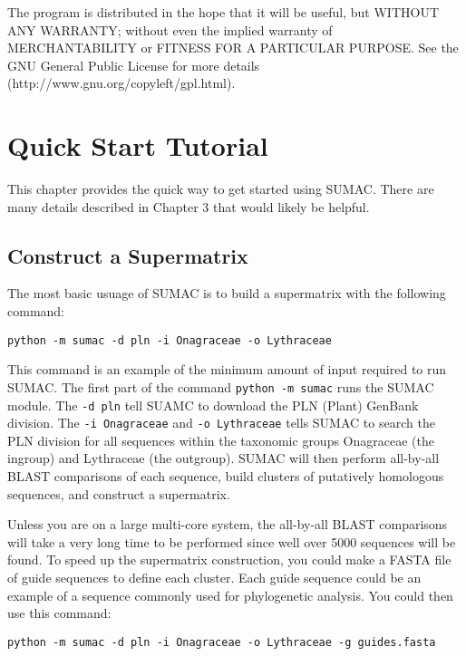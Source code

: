 \documentclass[10pt]{report}
\begin{document}
The program is distributed in the hope that it will be useful, but WITHOUT ANY WARRANTY; without even the implied warranty of MERCHANTABILITY or FITNESS FOR A PARTICULAR PURPOSE. See the GNU General Public License for more details \\ (http://www.gnu.org/copyleft/gpl.html).


\chapter{Quick Start Tutorial}

This chapter provides the quick way to get started using SUMAC. 
There are many details described in Chapter 3 that
would likely be helpful.

\section{Construct a Supermatrix}

The most basic usuage of SUMAC is to build a supermatrix with the following
command:

\begin{verbatim}
python -m sumac -d pln -i Onagraceae -o Lythraceae
\end{verbatim}

This command is an example of the minimum amount of input required
to run SUMAC. The first part of the command \texttt{python -m sumac}
runs the SUMAC module. The \texttt{-d pln}
tell SUAMC to download the PLN (Plant) GenBank division. The
\texttt{-i Onagraceae} and \texttt{-o Lythraceae}
tells SUMAC to search the PLN division for all sequences within
the taxonomic groups Onagraceae (the ingroup) and Lythraceae (the outgroup).
SUMAC will then perform all-by-all BLAST comparisons of each sequence, 
build clusters of putatively homologous sequences, and 
construct a supermatrix. 

Unless you are on a large multi-core system, the all-by-all BLAST comparisons
will take a very long time to be performed since well over 5000 sequences
will be found.
To speed up the supermatrix construction, you could make a FASTA file
of guide sequences to define each cluster. Each guide
sequence could be an example of a sequence commonly used for phylogenetic
analysis. 
You could then use this command:

\begin{verbatim}
python -m sumac -d pln -i Onagraceae -o Lythraceae -g guides.fasta
\end{verbatim}
\end{document}
